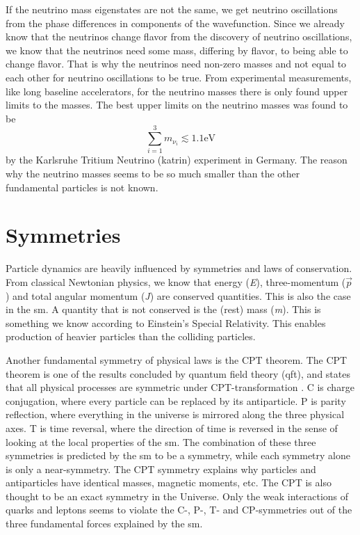 \documentclass[a4paper, american, 12pt]{report}
\begin{document}
	If the neutrino mass eigenstates are not the same, we get neutrino oscillations from the phase differences in components of the wavefunction. Since we already know that the neutrinos change flavor from the discovery of neutrino oscillations, we know that the neutrinos need some mass, differing by flavor, to being able to change flavor. That is why the neutrinos need non-zero masses and not equal to each other for neutrino oscillations to be true. From experimental measurements, like long baseline accelerators, for the neutrino masses there is only found upper limits to the masses. The best upper limits on the neutrino masses was found to be
	\begin{equation}
	\label{eq:Neutrino_mass_limit}
		\sum_{i=1}^{3}m_{\nu_i}\lesssim 1.1 \text{eV}
	\end{equation}
	by the Karlsruhe Tritium Neutrino (\acrshort{katrin})\cite{KATRIN} experiment in Germany.
	The reason why the neutrino masses seems to be so much smaller than the other fundamental particles is not known.
	
	
	\section{Symmetries}
	\label{sect:Theory-Symmetry}
	Particle dynamics are heavily influenced by symmetries and laws of conservation. From classical Newtonian physics, we know that energy (\textit{E}), three-momentum ($\vec{p}$) and total angular momentum (\textit{J}) are conserved quantities. This is also the case in the \acrshort{sm}. A quantity that is not conserved is the (rest) mass (\textit{m}). This is something we know according to Einstein's Special Relativity. This enables production of heavier particles than the colliding particles.
	
	Another fundamental symmetry of physical laws is the CPT theorem. The CPT theorem is one of the results concluded by quantum field theory (\acrshort{qft}), and states that all physical processes are symmetric under CPT-transformation \cite{CPT}. C is charge conjugation, where every particle can be replaced by its antiparticle. P is parity reflection, where everything in the universe is mirrored along the three physical axes. T is time reversal, where the direction of time is reversed in the sense of looking at the local properties of the \acrshort{sm}. The combination of these three symmetries is predicted by the \acrshort{sm} to be a symmetry, while each symmetry alone is only a near-symmetry. The CPT symmetry explains why particles and antiparticles have identical masses, magnetic moments, etc. The CPT is also thought to be an exact symmetry in the Universe. Only the weak interactions of quarks and leptons seems to violate the C-, P-, T- and CP-symmetries out of the three fundamental forces explained by the \acrshort{sm}.
	
\end{document}

